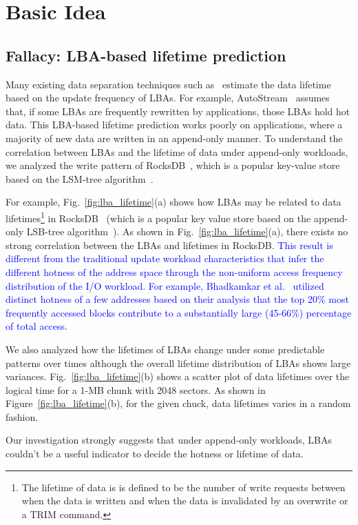 \section{Basic Idea}
\subsection{Fallacy: LBA-based lifetime prediction}
Many existing data separation techniques such as~\cite{AutoStream, HotCold} 
estimate the data lifetime based on the update frequency of LBAs.  
For example, AutoStream~\cite{AutoStream} assumes that, if
some LBAs are frequently rewritten by applications, those LBAs hold hot data.
This LBA-based lifetime prediction works poorly on applications, where
a majority of new data are written in an append-only manner.  To understand
the correlation between LBAs and the lifetime of data under append-only
workloads, we analyzed the write pattern of RocksDB~\cite{RocksDB}, which is a
popular key-value store based on the LSM-tree algorithm~\cite{LSM}.

For example, Fig.~\ref{fig:lba_lifetime}(a) shows how LBAs may be related 
to data lifetimes\footnote{The lifetime of data is is defined to be 
the number of write requests between when the data is written 
and when the data is invalidated by an overwrite or a TRIM command.}
in RocksDB~\cite{RocksDB} (which is a popular key value store 
based on the append-only LSB-tree algorithm~\cite{LSM}).  
As shown in Fig.~\ref{fig:lba_lifetime}(a), 
there exists no strong correlation between the LBAs and lifetimes in RocksDB.  
\textcolor{blue}{%
This result is different from the traditional update workload characteristics 
that infer the different hotness of the address space 
through the non-uniform access frequency distribution of the I/O workload.
For example, Bhadkamkar et al.~\cite{Skew} utilized distinct hotness of a few addresses
based on their analysis that the top 20\% most frequently accessed blocks
contribute to a substantially large (45-66\%) percentage
of total access.
}

We also analyzed 
how the lifetimes of LBAs change under some predictable patterns over times 
although the overall lifetime distribution of LBAs shows large variances.
Fig.~\ref{fig:lba_lifetime}(b) shows a scatter plot of data lifetimes over the logical time 
for a 1-MB chunk with 2048 sectors. 
As shown in Figure~\ref{fig:lba_lifetime}(b), 
for the given chuck, data lifetimes varies in a random fashion.  

Our investigation strongly suggests that under append-only
workloads, LBAs couldn't be a useful indicator to decide
the hotness or lifetime of data.

